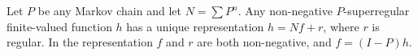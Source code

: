 Let $P$ be any Markov chain and let $N = \sum P^n$. Any non-negative $P$-superregular finite-valued function $h$ has a unique representation $h = Nf + r$, where $r$ is regular. In the representation $f$ and $r$ are both non-negative, and $f = (I - P)h$.
